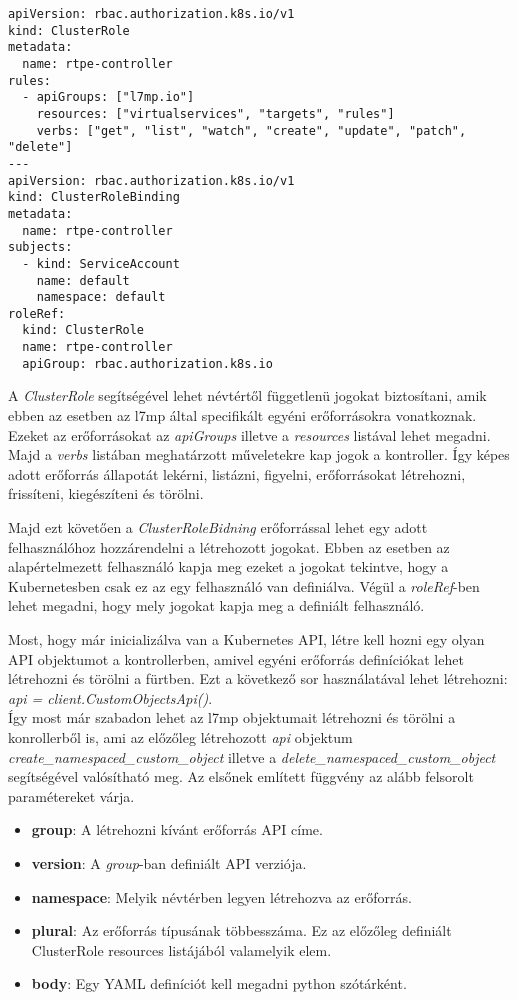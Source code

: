 \begin{lstlisting}
apiVersion: rbac.authorization.k8s.io/v1
kind: ClusterRole
metadata:
  name: rtpe-controller
rules:
  - apiGroups: ["l7mp.io"]
    resources: ["virtualservices", "targets", "rules"]
    verbs: ["get", "list", "watch", "create", "update", "patch", "delete"]
---
apiVersion: rbac.authorization.k8s.io/v1
kind: ClusterRoleBinding
metadata:
  name: rtpe-controller
subjects:
  - kind: ServiceAccount
    name: default
    namespace: default
roleRef:
  kind: ClusterRole
  name: rtpe-controller
  apiGroup: rbac.authorization.k8s.io
\end{lstlisting}

A \textit{ClusterRole} segítségével lehet névtértől függetlenü jogokat biztosítani,
amik ebben az esetben az l7mp által specifikált egyéni erőforrásokra vonatkoznak. 
Ezeket az erőforrásokat az \textit{apiGroups} illetve a \textit{resources} listával
lehet megadni. Majd a \textit{verbs} listában meghatárzott műveletekre kap 
jogok a kontroller. Így képes adott erőforrás állapotát lekérni, listázni, figyelni,
erőforrásokat létrehozni, frissíteni, kiegészíteni és törölni. 

Majd ezt követően a \textit{ClusterRoleBidning} erőforrással lehet egy adott
felhasználóhoz hozzárendelni a létrehozott jogokat. Ebben az esetben az alapértelmezett
felhasználó kapja meg ezeket a jogokat tekintve, hogy a Kubernetesben csak ez az egy
felhasználó van definiálva. Végül a \textit{roleRef}-ben lehet megadni, hogy mely
jogokat kapja meg a definiált felhasználó. 

Most, hogy már inicializálva van a Kubernetes API, létre kell hozni egy olyan 
API objektumot a kontrollerben, amivel egyéni erőforrás definíciókat lehet létrehozni
és törölni a fürtben. Ezt a következő sor használatával lehet létrehozni: 
\textit{api = client.CustomObjectsApi()}. \\

Így most már szabadon lehet az l7mp objektumait létrehozni és törölni a konrollerből is, 
ami az előzőleg létrehozott \textit{api} objektum \textit{create\_namespaced\_custom\_object}
illetve a \textit{delete\_namespaced\_custom\_object} segítségével valósítható meg. Az elsőnek
említett függvény az alább felsorolt paramétereket várja.

\begin{itemize}
	\item \textbf{group}: A létrehozni kívánt erőforrás API címe.  
	\item \textbf{version}: A \textit{group}-ban definiált API verziója. 
	\item \textbf{namespace}: Melyik névtérben legyen létrehozva az erőforrás.
	\item \textbf{plural}: Az erőforrás típusának többesszáma. Ez az előzőleg definiált
	ClusterRole resources listájából valamelyik elem. 
	\item \textbf{body}: Egy YAML definíciót kell megadni python szótárként. 
\end{itemize}

